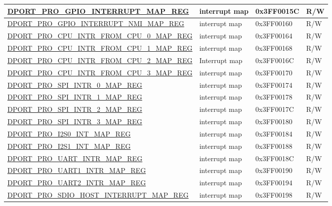 \begin{longtable}{ |L{8.2cm} | L{4.5cm} | l | l | }
\hyperref[regdesc:PROGPIOINTERRUPTMAPREG]{DPORT\_PRO\_GPIO\_INTERRUPT\_MAP\_REG} & interrupt map & 0x3FF0015C & R/W \\ \hline
\hyperref[regdesc:PROGPIOINTERRUPTNMIMAPREG]{DPORT\_PRO\_GPIO\_INTERRUPT\_NMI\_MAP\_REG} & interrupt map & 0x3FF00160 & R/W \\ \hline
\hyperref[regdesc:PROCPUINTRFROMCPU0MAPREG]{DPORT\_PRO\_CPU\_INTR\_FROM\_CPU\_0\_MAP\_REG} & interrupt map & 0x3FF00164 & R/W \\ \hline
\hyperref[regdesc:PROCPUINTRFROMCPU1MAPREG]{DPORT\_PRO\_CPU\_INTR\_FROM\_CPU\_1\_MAP\_REG} & interrupt map & 0x3FF00168 & R/W \\ \hline
\hyperref[regdesc:PROCPUINTRFROMCPU2MAPREG]{DPORT\_PRO\_CPU\_INTR\_FROM\_CPU\_2\_MAP\_REG} & Interrupt map & 0x3FF0016C & R/W \\ \hline
\hyperref[regdesc:PROCPUINTRFROMCPU3MAPREG]{DPORT\_PRO\_CPU\_INTR\_FROM\_CPU\_3\_MAP\_REG} & interrupt map & 0x3FF00170 & R/W \\ \hline
\hyperref[regdesc:PROSPIINTR0MAPREG]{DPORT\_PRO\_SPI\_INTR\_0\_MAP\_REG} & interrupt map & 0x3FF00174 & R/W \\ \hline
\hyperref[regdesc:PROSPIINTR1MAPREG]{DPORT\_PRO\_SPI\_INTR\_1\_MAP\_REG} & interrupt map & 0x3FF00178 & R/W \\ \hline
\hyperref[regdesc:PROSPIINTR2MAPREG]{DPORT\_PRO\_SPI\_INTR\_2\_MAP\_REG} & interrupt map & 0x3FF0017C & R/W \\ \hline
\hyperref[regdesc:PROSPIINTR3MAPREG]{DPORT\_PRO\_SPI\_INTR\_3\_MAP\_REG} & interrupt map & 0x3FF00180 & R/W \\ \hline
\hyperref[regdesc:PROI2S0INTMAPREG]{DPORT\_PRO\_I2S0\_INT\_MAP\_REG} & interrupt map & 0x3FF00184 & R/W \\ \hline
\hyperref[regdesc:PROI2S1INTMAPREG]{DPORT\_PRO\_I2S1\_INT\_MAP\_REG} & interrupt map & 0x3FF00188 & R/W \\ \hline
\hyperref[regdesc:PROUARTINTRMAPREG]{DPORT\_PRO\_UART\_INTR\_MAP\_REG} & interrupt map & 0x3FF0018C & R/W \\ \hline
\hyperref[regdesc:PROUART1INTRMAPREG]{DPORT\_PRO\_UART1\_INTR\_MAP\_REG} & interrupt map & 0x3FF00190 & R/W \\ \hline
\hyperref[regdesc:PROUART2INTRMAPREG]{DPORT\_PRO\_UART2\_INTR\_MAP\_REG} & interrupt map & 0x3FF00194 & R/W \\ \hline
\hyperref[regdesc:PROSDIOHOSTINTERRUPTMAPREG]{DPORT\_PRO\_SDIO\_HOST\_INTERRUPT\_MAP\_REG} & interrupt map & 0x3FF00198 & R/W \\ \hline

\end{longtable}
